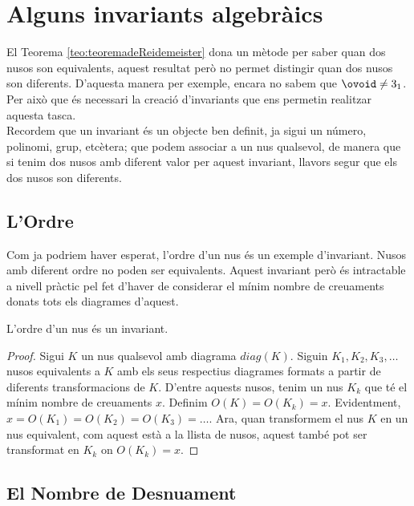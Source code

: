 
\section{Alguns invariants algebràics}\label{sec:Invariantsalgebraics}

El Teorema \ref{teo:teoremadeReidemeister} dona un mètode per saber quan dos nusos son equivalents, aquest resultat però no permet distingir quan dos nusos son diferents. D'aquesta manera per exemple, encara no sabem que $\ovoid\neq 3_1$. Per això que és necessari la creació d'invariants que ens permetin realitzar aquesta tasca.\\

Recordem que un invariant és un objecte ben definit, ja sigui un número, polinomi, grup, etcètera; que podem associar a un nus qualsevol, de manera que si tenim dos nusos amb diferent valor per aquest invariant, llavors segur que els dos nusos son diferents.

\subsection{L'Ordre}\label{sec:ordrecomainvariant}

Com ja podriem haver esperat, l'ordre d'un nus és un exemple d'invariant. Nusos amb diferent ordre no poden ser equivalents. Aquest invariant però és intractable a nivell pràctic pel fet d'haver de considerar el mínim nombre de creuaments donats tots els diagrames d'aquest.\\

\begin{proposition}
	L'ordre d'un nus és un invariant.
\end{proposition}

\begin{proof}
	Sigui $K$ un nus qualsevol amb diagrama $diag(K)$. Siguin $K_1, K_2, K_3, \dots$ nusos equivalents a $K$ amb els seus respectius diagrames formats a partir de diferents transformacions de $K$. D'entre aquests nusos, tenim un nus $K_k$ que té el mínim nombre de creuaments $x$. Definim $O(K)=O(K_k)=x$. Evidentment, $x=O(K_1)=O(K_2)=O(K_3)=\dots$. Ara, quan transformem el nus $K$ en un nus equivalent, com aquest està a la llista de nusos, aquest també pot ser transformat en $K_k$ on $O(K_k)=x$.
\end{proof}

\subsection{El Nombre de Desnuament}\label{sec:desnuamentcomainvariant}

